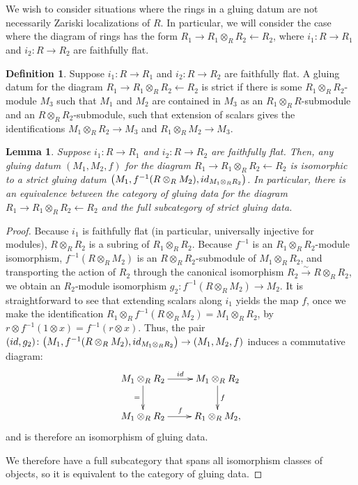 \documentclass[11pt]{article}
\newcommand{\simto}{\overset{\sim}{\to}}
\newtheorem{lem}[thm]{Lemma}
\theoremstyle{definition}
\newtheorem{defn}[thm]{Definition}
\begin{document}
We wish to consider situations where the rings in a gluing datum are not necessarily Zariski localizations of $R$. In particular, we will consider the case where the diagram of rings has the form $R_1 \to R_1 \otimes_{R} R_2 \leftarrow R_2$, where $i_1\colon R \to R_1$ and $i_2\colon R \to R_2$ are faithfully flat.

\begin{defn}Suppose $i_1\colon R \to R_1$ and $i_2\colon R \to R_2$ are faithfully flat. A gluing datum for the diagram $R_1 \to R_1 \otimes_{R} R_2 \leftarrow R_2$ is strict if there is some $R_1 \otimes_{R} R_2$-module $M_3$ such that $M_1$ and $M_2$ are contained in $M_3$ as an $R_1 \otimes_{R} R$-submodule and an $R \otimes_{R} R_2$-submodule, such that extension of scalars gives the identifications $M_1 \otimes_{R} R_2 \to M_3$ and $R_1 \otimes_{R} M_2 \to M_3$.
\end{defn}

\begin{lem} \label{lem:strict-gluing-data}Suppose $i_1\colon R \to R_1$ and $i_2\colon R \to R_2$ are faithfully flat. Then, any gluing datum $(M_1, M_2, f)$ for the diagram $R_1 \to R_1 \otimes_{R} R_2 \leftarrow R_2$ is isomorphic to a strict gluing datum $\big(M_1, f^{-1}(R \otimes_{R} M_2), {\rm id}_{M_1 \otimes_{R} R_2}\big)$. In particular, there is an equivalence between the category of gluing data for the diagram $R_1 \to R_1 \otimes_{R} R_2 \leftarrow R_2$ and the full subcategory of strict gluing data.
\end{lem}
\begin{proof}Because $i_1$ is faithfully flat (in particular, universally injective for modules), $R \otimes_{R} R_2$ is a subring of $R_1 \otimes_{R} R_2$. Because $f^{-1}$ is an $R_1 \otimes_{R} R_2$-module isomorphism, $f^{-1}(R \otimes_{R} M_2)$ is an $R \otimes_{R} R_2$-submodule of $M_1 \otimes_{R} R_2$, and transporting the action of $R_2$ through the canonical isomorphism $R_2 \simto R \otimes_{R} R_2$, we obtain an $R_2$-module isomorphism $g_2\colon f^{-1}(R \otimes_{R} M_2) \to M_2$. It is straightforward to see that extending scalars along $i_1$ yields the map $f$, once we make the identification $R_1 \otimes_{R} f^{-1}(R \otimes_{R} M_2) = M_1 \otimes_{R} R_2$, by $r \otimes f^{-1}(1 \otimes x) = f^{-1}(r \otimes x)$. Thus, the pair $({\rm id}, g_2)\colon \big(M_1, f^{-1}(R \otimes_{R} M_2), {\rm id}_{M_1 \otimes_{R} R_2}\big) \to (M_1, M_2, f)$ induces a commutative diagram:
\begin{gather*} \xymatrix{ M_1 \otimes_{R} R_2 \ar[d]_{=} \ar[r]^-{{\rm id}} & M_1 \otimes_{R} R_2 \ar[d]^{f} \\
M_1 \otimes_{R} R_2 \ar[r]^{f} & R_1 \otimes_{R} M_2, } \end{gather*}
and is therefore an isomorphism of gluing data.

We therefore have a full subcategory that spans all isomorphism classes of objects, so it is equivalent to the category of gluing data.
\end{proof}
\end{document}
